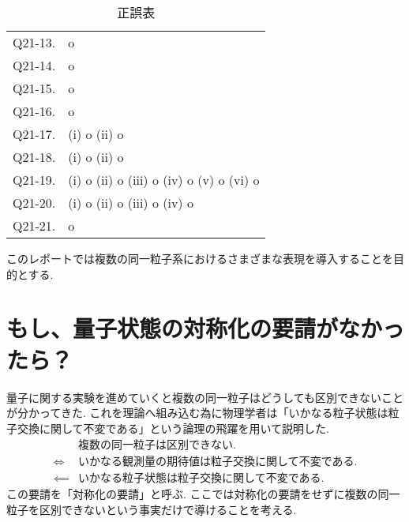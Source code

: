 \documentclass[uplatex,dvipdfmx,a4paper,11pt]{jlreq}
\numberwithin{equation}{section}
\theoremstyle{definition}
\begin{document}
\begin{table}[hbtp]
\begin{tabular}{ll}
    Q21-13. & o                                                                                                                     \\
    Q21-14. & o                                                                                                                     \\
    Q21-15. & o                                                                                                                     \\
    Q21-16. & o                                                                                                                     \\
    Q21-17. & (i) o (ii) o                                                                                                          \\
    Q21-18. & (i) o (ii) o                                                                                                          \\
    Q21-19. & (i) o (ii) o (iii) o (iv) o (v) o (vi) o                                                                              \\
    Q21-20. & (i) o (ii) o (iii) o (iv) o                                                                                           \\
    Q21-21. & o                                                                                                                     \\
    \hline
  \end{tabular}
  \caption{正誤表}
\end{table}
\clearpage

このレポートでは複数の同一粒子系におけるさまざまな表現を導入することを目的とする.

\section{もし、量子状態の対称化の要請がなかったら？}
量子に関する実験を進めていくと複数の同一粒子はどうしても区別できないことが分かってきた. これを理論へ組み込む為に物理学者は「いかなる粒子状態は粒子交換に関して不変である」という論理の飛躍を用いて説明した.
\begin{align}
             & \textrm{複数の同一粒子は区別できない.}            \\
  \iff       & \textrm{いかなる観測量の期待値は粒子交換に関して不変である.} \\
  \impliedby & \textrm{いかなる粒子状態は粒子交換に関して不変である.}
\end{align}
この要請を「対称化の要請」と呼ぶ. ここでは対称化の要請をせずに複数の同一粒子を区別できないという事実だけで導けることを考える.
\end{document}
